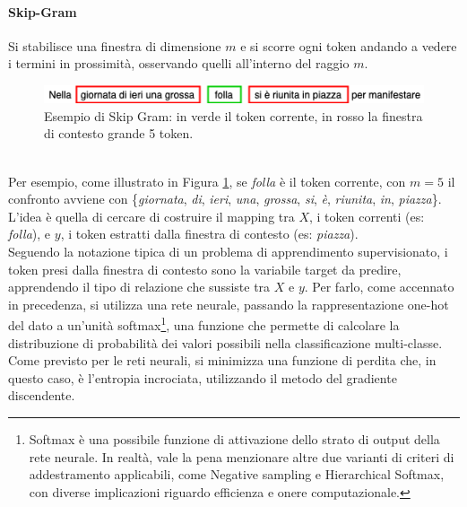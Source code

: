\documentclass[12pt]{report}
\theoremstyle{definition}
\begin{document}
\paragraph{Skip-Gram}
Si stabilisce una finestra di dimensione $m$ e si scorre ogni token andando a vedere i termini in prossimità, osservando quelli all'interno del raggio $m$.
\\
\begin{figure}
    \centering
    \includegraphics[scale = 0.7]{images/skip-gram.png}
    \caption{Esempio di Skip Gram: in verde il token corrente, in rosso la finestra di contesto grande 5 token.}
    \label{skipgram}
\end{figure}
\\
Per esempio, come illustrato in Figura \ref{skipgram}, se \textit{folla} è il token corrente, con $m = 5$ il confronto avviene con \{\textit{giornata}, \textit{di}, \textit{ieri}, \textit{una}, \textit{grossa}, \textit{si}, \textit{è}, \textit{riunita}, \textit{in}, \textit{piazza}\}.
\\
L'idea è quella di cercare di costruire il mapping tra $X$, i token correnti (es: \textit{folla}), e $y$, i token estratti dalla finestra di contesto (es: \textit{piazza}).
\\
Seguendo la notazione tipica di un problema di apprendimento supervisionato, i token presi dalla finestra di contesto sono la variabile target da predire, apprendendo il tipo di relazione che sussiste tra  $X$ e $y$.
Per farlo, come accennato in precedenza, si utilizza una rete neurale, passando la rappresentazione one-hot del dato a un'unità softmax\footnote{Softmax è una possibile funzione di attivazione dello strato di output della rete neurale. In realtà, vale la pena menzionare altre due varianti di criteri di addestramento applicabili, come Negative sampling e Hierarchical Softmax, con diverse implicazioni riguardo efficienza e onere computazionale.}, una funzione che permette di calcolare la distribuzione di probabilità dei valori possibili nella classificazione multi-classe. Come previsto per le reti neurali, si minimizza una funzione di perdita che, in questo caso, è l'entropia incrociata, utilizzando il metodo del gradiente discendente. 
\end{document}
